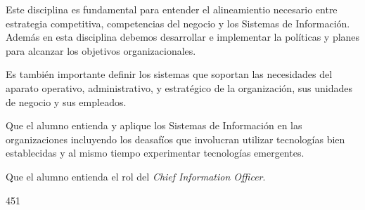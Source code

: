 \begin{syllabus}


\begin{justification}
Este disciplina es fundamental para entender el alineamientio necesario entre estrategia competitiva, competencias del negocio y los Sistemas de Información. Además en esta disciplina debemos desarrollar e implementar la políticas y planes para alcanzar los objetivos organizacionales.

Es también importante definir los sistemas que soportan las necesidades del aparato operativo, administrativo, y estratégico de la organización, sus unidades de negocio y sus empleados.
\end{justification}

\begin{goals}
\item Que el alumno entienda y aplique los Sistemas de Información en las organizaciones incluyendo los deasafíos que involucran utilizar tecnologías bien establecidas y al mismo tiempo experimentar tecnologías emergentes.
\item Que el alumno entienda el rol del \textit{Chief Information Officer}.
\end{goals}

\begin{outcomes}
\end{outcomes}

\begin{unit}{\LUTWOONEOHDef}{\LUTWOONEOHBib}{45}{1}
   \begin{topics}
		\item \OMCONETopicTWOxONExFOUR
		\item \OMCONETopicTWOxONExFIVE
		\item \OMCTWOTopicTWOxTWOxFIVE
		\item \OMCTWOTopicTWOxTWOxONE
		\item \TDSSEVENTopicTHREExSEVENxFIVE
		\item \TDSONEOHTopicTHREExONEOHxEIGHT
		\item \OMCTWOTopicTWOxTWOxFOUR
   \end{topics}
	\LUTWOONEOHGoal
\end{unit}


\end{syllabus}
